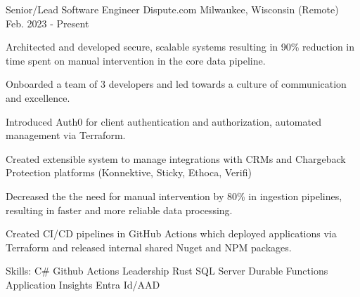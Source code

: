 

\begin{cventries}

  \cventry
 {Senior/Lead Software Engineer} %
 {Dispute.com} %
 {Milwaukee, Wisconsin (Remote)} %
 {Feb. 2023 - Present} %
 {
      \begin{cvitems} %
        \item {Architected and developed secure, scalable systems resulting in 90\% reduction in time spent on 
 manual intervention in the core data pipeline.}
        \item {Onboarded a team of 3 developers and led towards a culture of communication and excellence.}
        \item {Introduced Auth0 for client authentication and authorization, automated management via Terraform.}
        \item {Created extensible system to manage integrations with CRMs and Chargeback Protection platforms (Konnektive, Sticky, Ethoca, Verifi)}
        \item {Decreased the the need for manual intervention by 80\% in ingestion pipelines, resulting in faster and more reliable data processing.}
        \item {Created CI/CD pipelines in GitHub Actions which deployed applications via Terraform and released internal shared Nuget and NPM packages.}
        \item {Skills: C\# \textbullet{} Github Actions \textbullet{} Leadership \textbullet{} Rust \textbullet{} SQL Server \textbullet{} Durable Functions \textbullet{} Application Insights \textbullet{} Entra Id/AAD}
      \end{cvitems}
 }


\end{cventries}
